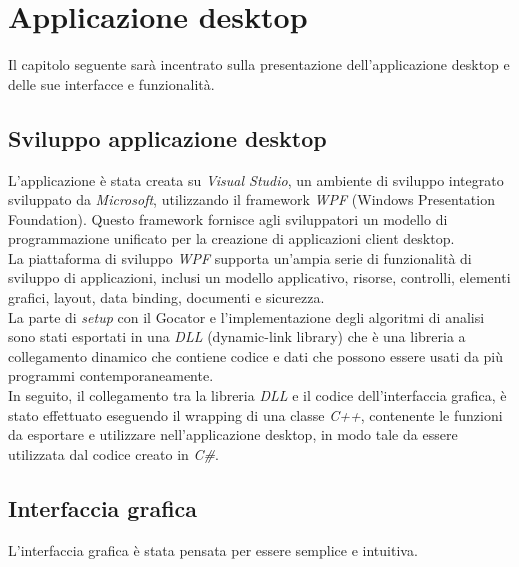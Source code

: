 \chapter{Applicazione desktop}
\label{Cha:desktop}
\thispagestyle{empty}

Il capitolo seguente sarà incentrato sulla presentazione dell'applicazione desktop e delle sue interfacce e funzionalità.


\section{Sviluppo applicazione desktop}

L'applicazione è stata creata su \textit{Visual Studio}, un ambiente di sviluppo integrato sviluppato da \textit{Microsoft}, utilizzando il framework \textit{WPF} (Windows Presentation Foundation). Questo framework fornisce agli sviluppatori un modello di programmazione unificato per la creazione di applicazioni client desktop.\\
\newline
La piattaforma di sviluppo \textit{WPF} supporta un'ampia serie di funzionalità di sviluppo di applicazioni, inclusi un modello applicativo, risorse, controlli, elementi grafici, layout, data binding, documenti e sicurezza.\\
\newline
La parte di \textit{setup} con il Gocator e l'implementazione degli algoritmi di analisi sono stati esportati in una \textit{DLL} (dynamic-link library) che è una libreria a collegamento dinamico che contiene codice e dati che possono essere usati da più programmi contemporaneamente.\\
\newline
In seguito, il collegamento tra la libreria \textit{DLL} e il codice dell'interfaccia grafica, è stato effettuato eseguendo il wrapping di una classe \textit{C++}, contenente le funzioni da esportare e utilizzare nell'applicazione desktop, in modo tale da essere utilizzata dal codice creato in \textit{C\#}.

\section{Interfaccia grafica}

L'interfaccia grafica è stata pensata per essere semplice e intuitiva.\\

